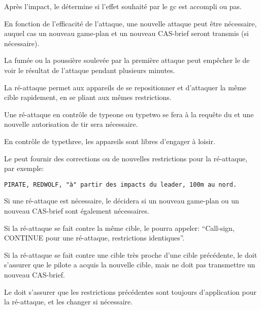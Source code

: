 Après l'impact, le \ja{} détermine si l'effet souhaité par le \gls{gc} est accompli ou pas.

\begin{e1}
	
	\item En fonction de l'efficacité de l'attaque, une nouvelle attaque peut être nécessaire, auquel cas un nouveau game-plan et un nouveau CAS-brief seront transmis (si nécessaire).
	
	\item La fumée ou la poussière soulevée par la première attaque peut empêcher le \ja{} de voir le résultat de l'attaque pendant plusieurs minutes.
	
	\item La ré-attaque permet aux appareils de se repositionner et d'attaquer la même cible rapidement, en se pliant aux mêmes restrictions.
	
	\item Une ré-attaque en contrôle de \gls{typeone} ou \gls{typetwo} se fera à la requête du \ja{} et une nouvelle autorisation de tir sera nécessaire.
	
	En contrôle de \gls{typethree}, les appareils sont libres d'engager à loisir.
	
	\begin{minipage}{\linewidth}
		
		\item Le \ja{} peut fournir des corrections ou de nouvelles restrictions pour la ré-attaque, par exemple:
		\begin{lstlisting}[caption=Evaluation: ré-attaque, label=9lbdareattack]
	PIRATE, REDWOLF, "à" partir des impacts du leader, 100m au nord.
		\end{lstlisting}
	\end{minipage}
	
	\item Si une ré-attaque est nécessaire, le \ja{} décidera si un nouveau game-plan ou un nouveau CAS-brief sont également nécessaires.
	
	\item Si la ré-attaque se fait contre la même cible, le \ja{} pourra appeler: ``Call-sign, CONTINUE pour une ré-attaque, restrictions identiques''.
	
	\item Si la ré-attaque se fait contre une cible très proche d'une cible précédente, le \ja{} doit s'assurer que le pilote a acquis la nouvelle cible, mais ne doit pas transmettre un nouveau CAS-brief.
	
	\item Le \ja{} doit s'assurer que les restrictions précédentes sont toujours d'application pour la ré-attaque, et les changer si nécessaire.
	
\end{e1}

